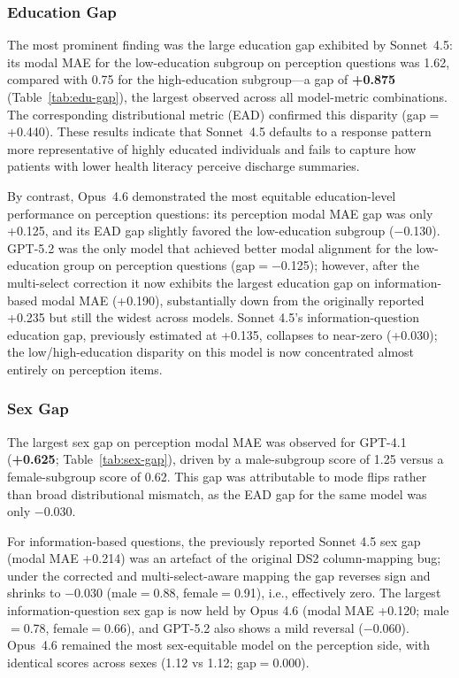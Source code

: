 \subsubsection{Education Gap}

The most prominent finding was the large education gap exhibited by Sonnet~4.5:
its modal MAE for the low-education subgroup on perception questions was 1.62,
compared with 0.75 for the high-education subgroup---a gap of \textbf{+0.875}
(Table~\ref{tab:edu-gap}), the largest observed across all model-metric
combinations. The corresponding distributional metric (EAD) confirmed this
disparity (gap$=$+0.440). These results indicate that
Sonnet~4.5 defaults to a response pattern more representative of highly
educated individuals and fails to capture how patients with lower health
literacy perceive discharge summaries.

By contrast, Opus~4.6 demonstrated the most equitable education-level
performance on perception questions: its perception modal MAE gap was only
+0.125, and its EAD gap slightly favored the low-education subgroup
($-$0.130). GPT-5.2 was the only model that achieved better modal alignment
for the low-education group on perception questions (gap$=$$-$0.125);
however, after the multi-select correction it now exhibits
the largest education gap on information-based modal MAE (+0.190),
substantially down from the originally reported +0.235 but still the widest
across models. Sonnet 4.5's information-question education gap, previously
estimated at +0.135, collapses to near-zero (+0.030); the low/high-education
disparity on this model is now concentrated almost entirely on perception
items.

\subsubsection{Sex Gap}

The largest sex gap on perception modal MAE was observed for GPT-4.1
(\textbf{+0.625}; Table~\ref{tab:sex-gap}), driven by a male-subgroup
score of 1.25 versus a female-subgroup score of 0.62. This gap
was attributable to mode flips rather than broad distributional
mismatch, as the EAD gap for the same model was only $-$0.030.

For information-based questions, the previously reported
Sonnet 4.5 sex gap (modal MAE +0.214) was an artefact of the original DS2
column-mapping bug; under the corrected and multi-select-aware mapping the
gap reverses sign and shrinks to $-$0.030 (male$=$0.88, female$=$0.91),
i.e., effectively zero. The largest information-question sex gap is now
held by Opus 4.6 (modal MAE +0.120; male$=$0.78, female$=$0.66), and
GPT-5.2 also shows a mild reversal ($-$0.060). Opus~4.6 remained the most
sex-equitable model on the perception side, with identical scores across
sexes (1.12 vs 1.12; gap$=$0.000).

